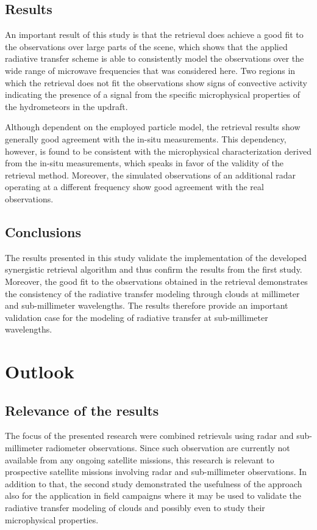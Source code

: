 \subsection{Results}

An important result of this study is that the retrieval does achieve a good fit
to the observations over large parts of the scene, which shows that the applied
radiative transfer scheme is able to consistently model the observations over
the wide range of microwave frequencies that was considered here. Two regions in
which the retrieval does not fit the observations show signs of convective
activity indicating the presence of a signal from the specific microphysical
properties of the hydrometeors in the updraft.

Although dependent on the employed particle model, the retrieval results show
generally good agreement with the in-situ measurements. This dependency,
however, is found to be consistent with the microphysical characterization
derived from the in-situ measurements, which speaks in favor of the validity of
the retrieval method. Moreover, the simulated observations of an additional
radar operating at a different frequency show good agreement with the real
observations.

\subsection{Conclusions}

The results presented in this study validate the implementation of the developed
synergistic retrieval algorithm and thus confirm the results from the first
study. Moreover, the good fit to the observations obtained in the retrieval
demonstrates the consistency of the radiative transfer modeling through clouds
at millimeter and sub-millimeter wavelengths. The results therefore provide an
important validation case for the modeling of radiative transfer at
sub-millimeter wavelengths.

\section{Outlook}

\subsection{Relevance of the results}

The focus of the presented research were combined retrievals using radar and
sub-millimeter radiometer observations. Since such observation are currently not
available from any ongoing satellite missions, this research is relevant to
prospective satellite missions involving radar and sub-millimeter observations.
In addition to that, the second study demonstrated the usefulness of the
approach also for the application in field campaigns where it may be used to
validate the radiative transfer modeling of clouds and possibly even to study
their microphysical properties.


